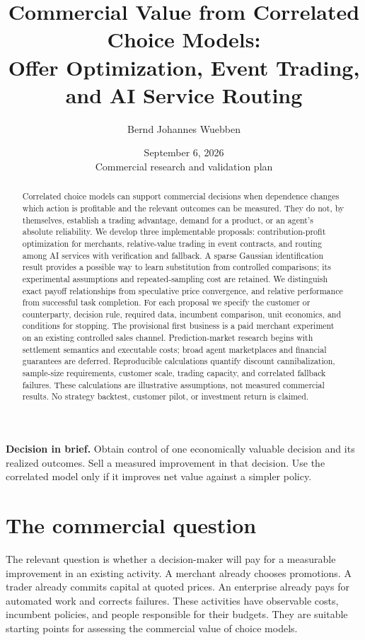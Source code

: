 \documentclass[11pt]{article}
\title{Commercial Value from Correlated Choice Models:\\
Offer Optimization, Event Trading, and AI Service Routing}
\author{Bernd Johannes Wuebben}
\date{September 6, 2026\\[4pt]\small Commercial research and validation plan}
\theoremstyle{remark}\newtheorem{example}{Example}
\begin{document}
\maketitle
\begin{abstract}
Correlated choice models can support commercial decisions when dependence changes
which action is profitable and the relevant outcomes can be measured. They do
not, by themselves, establish a trading advantage, demand for a product, or an
agent's absolute reliability. We develop three implementable proposals:
contribution-profit optimization for merchants, relative-value trading in event
contracts, and routing among AI services with verification and fallback. A sparse
Gaussian identification result provides a possible way to learn substitution
from controlled comparisons; its experimental assumptions and repeated-sampling
cost are retained. We distinguish exact payoff relationships from speculative
price convergence, and relative performance from successful task completion.
For each proposal we specify the customer or counterparty, decision rule,
required data, incumbent comparison, unit economics, and conditions for stopping.
The provisional first business is a paid merchant experiment on an existing
controlled sales channel. Prediction-market research begins with settlement
semantics and executable costs; broad agent marketplaces and financial guarantees
are deferred. Reproducible calculations quantify discount cannibalization,
sample-size requirements, customer scale, trading capacity, and correlated
fallback failures. These calculations are illustrative assumptions, not measured
commercial results. No strategy backtest, customer pilot, or investment return
is claimed.
\end{abstract}
\vspace{4pt}
\noindent\textbf{Decision in brief.} Obtain control of one economically valuable
decision and its realized outcomes. Sell a measured improvement in that decision.
Use the correlated model only if it improves net value against a simpler policy.

\section{The commercial question}
The relevant question is whether a decision-maker will pay for a measurable
improvement in an existing activity. A merchant already chooses promotions. A
trader already commits capital at quoted prices. An enterprise already pays for
automated work and corrects failures. These activities have observable costs,
incumbent policies, and people responsible for their budgets. They are suitable
starting points for assessing the commercial value of choice models.
\end{document}
